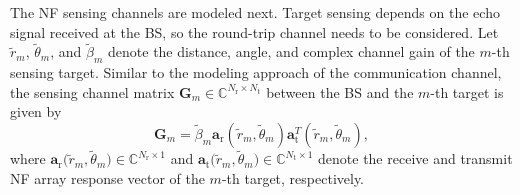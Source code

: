 \documentclass[10pt,journal,twocolumn]{IEEEtran}
\begin{document}
The NF sensing channels are modeled next. Target sensing depends on the echo signal received at the BS, so the round-trip channel needs to be considered. Let $\tilde r_m$, $\tilde \theta_m$, and $\tilde\beta_m$  denote the distance, angle, and complex channel gain of the $m$-th sensing target. Similar to the modeling approach of the communication channel, the sensing channel matrix $\mathbf{G}_m\in\mathbb{C}^{N_{\text{r}}\times N_{\text{t}}}$ between the BS and the $m$-th target is given by
\begin{equation}
\mathbf{G}_m=\tilde\beta_m\mathbf{a}_\text{r}\left(\tilde r_m,\tilde\theta_m\right)\mathbf{a}_\text{t}^T\left(\tilde r_m,\tilde\theta_m\right),
\end{equation}
where $\mathbf{a}_\text{r}\big(\tilde r_m,\tilde\theta_m\big)\in\mathbb{C}^{N_{\text{r}}\times 1}$ and $\mathbf{a}_\text{t}\big(\tilde r_m,\tilde\theta_m\big)\in\mathbb{C}^{N_{\text{t}}\times 1}$ denote the receive and transmit NF array response vector of the $m$-th target, respectively.
\end{document}
